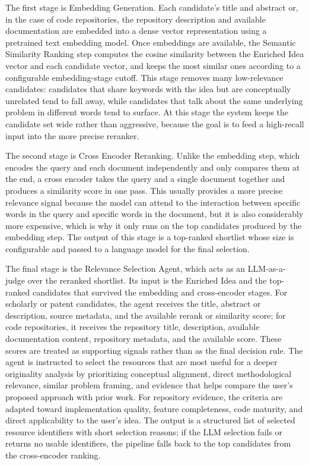 The first stage is Embedding Generation. Each candidate's title and abstract or, in the case of code repositories, the repository description and available documentation are embedded into a dense vector representation using a pretrained text embedding model. Once embeddings are available, the Semantic Similarity Ranking step computes the cosine similarity between the Enriched Idea vector and each candidate vector, and keeps the most similar ones according to a configurable embedding-stage cutoff. This stage removes many low-relevance candidates: candidates that share keywords with the idea but are conceptually unrelated tend to fall away, while candidates that talk about the same underlying problem in different words tend to surface. At this stage the system keeps the candidate set wide rather than aggressive, because the goal is to feed a high-recall input into the more precise reranker.

The second stage is Cross Encoder Reranking. Unlike the embedding step, which encodes the query and each document independently and only compares them at the end, a cross encoder takes the query and a single document together and produces a similarity score in one pass. This usually provides a more precise relevance signal because the model can attend to the interaction between specific words in the query and specific words in the document, but it is also considerably more expensive, which is why it only runs on the top candidates produced by the embedding step. The output of this stage is a top-ranked shortlist whose size is configurable and passed to a language model for the final selection.

The final stage is the Relevance Selection Agent, which acts as an LLM-as-a-judge over the reranked shortlist. Its input is the Enriched Idea and the top-ranked candidates that survived the embedding and cross-encoder stages. For scholarly or patent candidates, the agent receives the title, abstract or description, source metadata, and the available rerank or similarity score; for code repositories, it receives the repository title, description, available documentation content, repository metadata, and the available score. These scores are treated as supporting signals rather than as the final decision rule. The agent is instructed to select the resources that are most useful for a deeper originality analysis by prioritizing conceptual alignment, direct methodological relevance, similar problem framing, and evidence that helps compare the user's proposed approach with prior work. For repository evidence, the criteria are adapted toward implementation quality, feature completeness, code maturity, and direct applicability to the user's idea. The output is a structured list of selected resource identifiers with short selection reasons; if the LLM selection fails or returns no usable identifiers, the pipeline falls back to the top candidates from the cross-encoder ranking.

